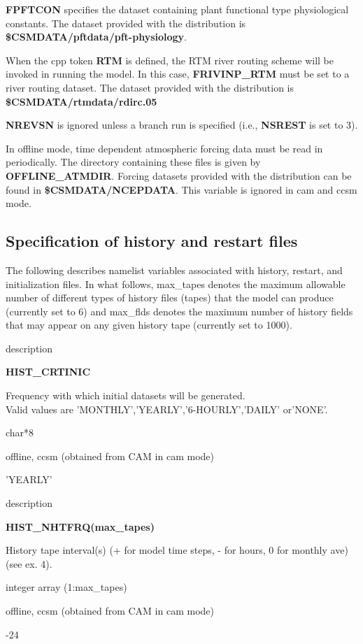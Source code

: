 {\bf FPFTCON} specifies the dataset containing plant functional type
physiological constants. The dataset provided with the distribution is
{\bf \$CSMDATA/pftdata/pft-physiology}.

When the cpp token {\bf RTM} is defined, the RTM river routing scheme
will be invoked in running the model. In this case, {\bf FRIVINP\_RTM}
must be set to a river routing dataset. The dataset provided with the
distribution is {\bf \$CSMDATA/rtmdata/rdirc.05}

{\bf NREVSN} is ignored unless a branch run is specified (i.e., {\bf
NSREST} is set to 3).

In offline mode, time dependent atmospheric forcing data must be read
in periodically. The directory containing these files is given by {\bf
OFFLINE\_ATMDIR}. Forcing datasets provided with the distribution can
be found in {\bf \$CSMDATA/NCEPDATA}. This variable is ignored
in cam and ccsm mode.

\subsection {Specification of history and restart files}
\label{subsec_history_namelist}

The following describes namelist variables associated with history,
restart, and initialization files. In what follows, max\_tapes
denotes the maximum allowable number of different types of history
files (tapes) that the model can produce (currently set to 6) and
max\_flds denotes the maximum number of history fields that may appear
on any given history tape (currently set to 1000).

\bigskip
\begin{Ventry}{description}
 \item[{\bf name}] {\bf HIST\_CRTINIC}     
 \item[description] Frequency with which initial datasets will be 
	generated. \\ Valid values are 'MONTHLY','YEARLY','6-HOURLY','DAILY' or'NONE'. 
 \item[type] char*8     
 \item[mode] offline, ccsm (obtained from CAM in cam mode) 
 \item[default] 'YEARLY'                                                        
\end{Ventry}
\medskip

\begin{Ventry}{description}
 \item[{\bf name}] {\bf HIST\_NHTFRQ(max\_tapes)}     
 \item[description] History tape interval(s) \newline
	(+ for model time steps, - for hours, 0 for monthly ave) (see ex. 4). 
 \item[type] integer array (1:max\_tapes)   
 \item[mode] offline, ccsm (obtained from CAM in cam mode) 
 \item[default] -24                                                             
\end{Ventry}
\medskip

